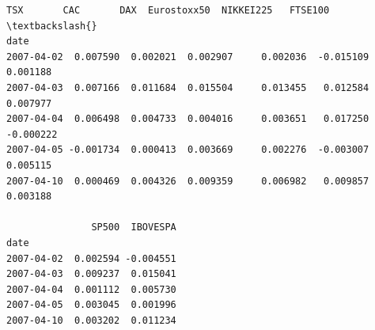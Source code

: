 \documentclass[11pt]{article}
\begin{document}
            \begin{tcolorbox}[breakable, size=fbox, boxrule=.5pt, pad at break*=1mm, opacityfill=0]
\begin{Verbatim}[commandchars=\\\{\}]
                 TSX       CAC       DAX  Eurostoxx50  NIKKEI225   FTSE100  \textbackslash{}
date
2007-04-02  0.007590  0.002021  0.002907     0.002036  -0.015109  0.001188
2007-04-03  0.007166  0.011684  0.015504     0.013455   0.012584  0.007977
2007-04-04  0.006498  0.004733  0.004016     0.003651   0.017250 -0.000222
2007-04-05 -0.001734  0.000413  0.003669     0.002276  -0.003007  0.005115
2007-04-10  0.000469  0.004326  0.009359     0.006982   0.009857  0.003188

               SP500  IBOVESPA
date
2007-04-02  0.002594 -0.004551
2007-04-03  0.009237  0.015041
2007-04-04  0.001112  0.005730
2007-04-05  0.003045  0.001996
2007-04-10  0.003202  0.011234
\end{Verbatim}
\end{tcolorbox}
        
\end{document}
